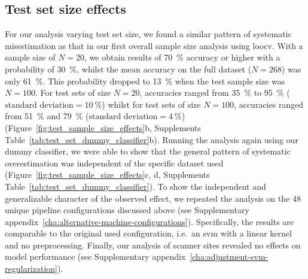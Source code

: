\documentclass[12pt,a4paper]{article}
\begin{document}
    \subsection{Test set size effects}
    For our analysis varying test set size, we found a similar pattern of systematic misestimation as that in our first overall sample size analysis using \ac{loocv}. With a sample size of $N=\num{20}$, we obtain results of \SI{70}{\percent} accuracy or higher with a probability of \SI{30}{\percent}, whilst the mean accuracy on the full dataset ($N=268$) was only \SI{61}{\percent}. This probability dropped to \SI{13}{\percent} when the test sample size was $N=100$. For test sets of size $N=20$, accuracies ranged from \SI{35}{\percent} to \SI{95}{\percent} ($\text{standard deviation}=\SI{10}{\percent}$) whilst for test sets of size $N=100$, accuracies ranged from \SI{51}{\percent} and \SI{79}{\percent} ($\text{standard deviation}=\SI{4}{\percent}$) (Figure~\ref{fig:test_sample_size_effects}b, Supplements Table~\ref{tab:test_set_dummy_classifier}b). Running the analysis again using our dummy classifier, we were able to show that the general pattern of systematic overestimation was independent of the specific dataset used (Figure~\ref{fig:test_sample_size_effects}c, d, Supplements Table~\ref{tab:test_set_dummy_classifier}). To show the independent and generalizable character of the observed effect, we repeated the analysis on the \num{48} unique pipeline configurations discussed above (see Supplementary appendix~\ref{cha:alternative-machine-configurations}). Specifically, the results are comparable to the original used configuration, i.e.\ an \ac{svm} with a linear kernel and no preprocessing. Finally, our analysis of scanner sites revealed no effects on model performance (see Supplementary appendix~\ref{cha:adjustment-svm-regularization}).
\end{document}
